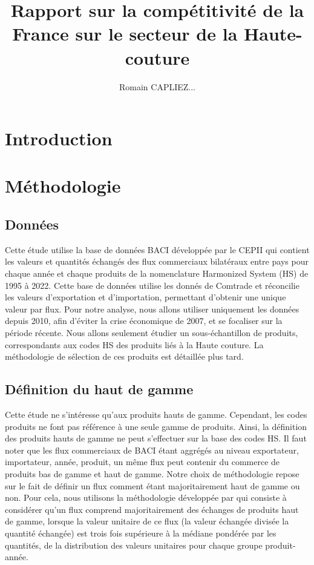 \documentclass[french,10pt,a4paper]{article}
\title{Rapport sur la compétitivité de la France sur le secteur de la Haute-couture}
\author{Romain CAPLIEZ...}
\begin{document}
\maketitle

\section{Introduction}

\section{Méthodologie}

\subsection{Données}

Cette étude utilise la base de données BACI développée par le CEPII \citep{Gaulier2010} qui contient les valeurs et quantités échangés des flux commerciaux bilatéraux entre pays pour chaque année et chaque produits de la nomenclature Harmonized System (HS) de 1995 à 2022. Cette base de données utilise les donnés de Comtrade et réconcilie les valeurs d'exportation et d'importation, permettant d'obtenir une unique valeur par flux. Pour notre analyse, nous allons utiliser uniquement les données depuis 2010, afin d'éviter la crise économique de 2007, et se focaliser sur la période récente. Nous allons seulement étudier un sous-échantillon de produits, correspondants aux codes HS des produits liés à la Haute couture. La méthodologie de sélection de ces produits est détaillée plus tard.

\subsection{Définition du haut de gamme}

Cette étude ne s'intéresse qu'aux produits hauts de gamme. Cependant, les codes produits ne font pas référence à une seule gamme de produits. Ainsi, la définition des produits hauts de gamme ne peut s'effectuer sur la base des codes HS. Il faut noter que les flux commerciaux de BACI étant aggrégés au niveau exportateur, importateur, année, produit, un même flux peut contenir du commerce de produits bas de gamme et haut de gamme. Notre choix de méthodologie repose sur le fait de définir un flux comment étant majoritairement haut de gamme ou non. Pour cela, nous utilisons la méthodologie développée par \cite{Fontagne1997} qui consiste à considérer qu'un flux comprend majoritairement des échanges de produits haut de gamme, lorsque la valeur unitaire de ce flux (la valeur échangée divisée la quantité échangée) est trois fois supérieure à la médiane pondérée par les quantités, de la distribution des valeurs unitaires pour chaque groupe produit-année.
\end{document}

